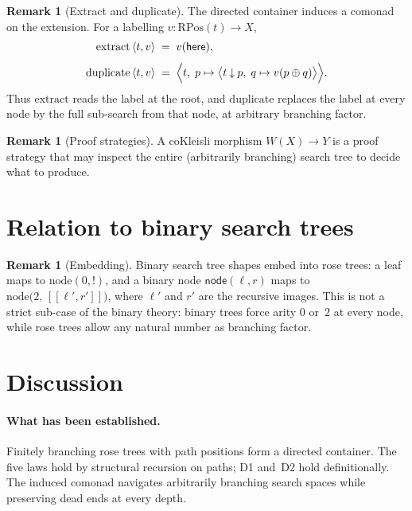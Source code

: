 \documentclass[11pt,a4paper]{article}
\theoremstyle{plain}
\theoremstyle{definition}
\newtheorem{remark}[theorem]{Remark}
\newcommand{\RPos}{\mathrm{RPos}}
\begin{document}
\begin{remark}[Extract and duplicate]
The directed container induces a comonad on the extension. For a
labelling $v : \RPos(t) \to X$,
\begin{align}
  \mathrm{extract}\,\langle t, v \rangle
  &\;=\; v(\mathsf{here}), \\[4pt]
  \mathrm{duplicate}\,\langle t, v \rangle
  &\;=\;
  \Bigl\langle
    t,\;
    p \mapsto
    \bigl\langle
      t \mathbin{\downarrow} p,\;
      q \mapsto v(p \oplus q)
    \bigr\rangle
  \Bigr\rangle.
\end{align}
Thus $\mathrm{extract}$ reads the label at the root, and
$\mathrm{duplicate}$ replaces the label at every node by the full
sub-search from that node, at arbitrary branching factor.
\end{remark}

\begin{remark}[Proof strategies]
A coKleisli morphism $W(X) \to Y$ is a proof strategy that may inspect
the entire (arbitrarily branching) search tree to decide what to
produce.
\end{remark}

\section{Relation to binary search trees}

\begin{remark}[Embedding]
Binary search tree shapes embed into rose trees: a leaf maps to
$\mathrm{node}(0, {!})$, and a binary node $\mathsf{node}(\ell, r)$ maps
to $\mathrm{node}\bigl(2,\, [\![\ell', r']\!]\bigr)$, where $\ell'$ and
$r'$ are the recursive images. This is not a strict sub-case of the
binary theory: binary trees force arity $0$ or~$2$ at every node, while
rose trees allow any natural number as branching factor.
\end{remark}

\section{Discussion}

\paragraph{What has been established.}
Finitely branching rose trees with path positions form a directed
container. The five laws hold by structural recursion on paths; D1
and~D2 hold definitionally. The induced comonad navigates arbitrarily
branching search spaces while preserving dead ends at every depth.
\end{document}
